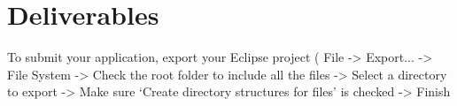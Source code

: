 \section{Deliverables}

To submit your application, export your Eclipse project ( File -> Export... -> File System -> Check the root folder to include all the files -> Select a directory to export -> Make sure ‘Create directory structures for files’ is checked -> Finish
